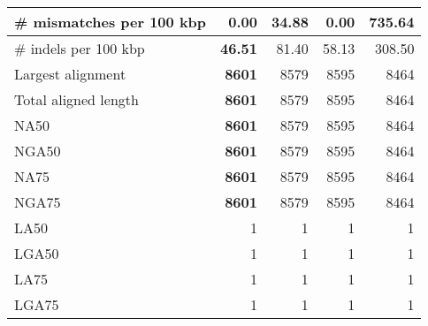 \documentclass[12pt,a4paper]{article}
\begin{document}
\begin{table}[ht]
\begin{center}
\begin{tabular}{|l*{4}{|r}|}
\# mismatches per 100 kbp & {\bf 0.00} & 34.88 & {\bf 0.00} & 735.64 \\ \hline
\# indels per 100 kbp & {\bf 46.51} & 81.40 & 58.13 & 308.50 \\ \hline
Largest alignment & {\bf 8601} & 8579 & 8595 & 8464 \\ \hline
Total aligned length & {\bf 8601} & 8579 & 8595 & 8464 \\ \hline
NA50 & {\bf 8601} & 8579 & 8595 & 8464 \\ \hline
NGA50 & {\bf 8601} & 8579 & 8595 & 8464 \\ \hline
NA75 & {\bf 8601} & 8579 & 8595 & 8464 \\ \hline
NGA75 & {\bf 8601} & 8579 & 8595 & 8464 \\ \hline
LA50 & 1 & 1 & 1 & 1 \\ \hline
LGA50 & 1 & 1 & 1 & 1 \\ \hline
LA75 & 1 & 1 & 1 & 1 \\ \hline
LGA75 & 1 & 1 & 1 & 1 \\ \hline
\end{tabular}
\end{center}
\end{table}
\end{document}
